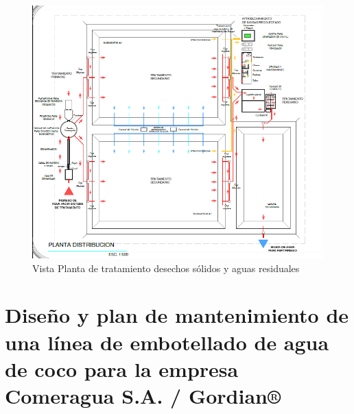 \documentclass[11pt,spanish,Letterpaper,openany]{book}
\begin{document}
\begin{figure}[H]

{\centering \includegraphics[width=1\linewidth]{images/201901-gfong-imagen09} 

}

\caption{Vista Planta de tratamiento desechos sólidos y aguas residuales}\label{fig:unnamed-chunk-25}
\end{figure}

\hypertarget{lcalmo}{%
\chapter{Diseño y plan de mantenimiento de una línea de embotellado de agua de coco para la empresa Comeragua S.A. / Gordian®}\label{lcalmo}}
\end{document}
